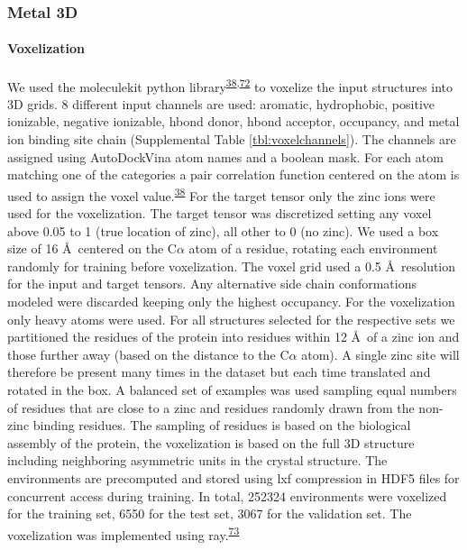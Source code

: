 \documentclass[  ASAPversion,
  ,
  9pt]{elife}
\begin{document}
\hypertarget{metal-3d}{%
\subsubsection{Metal 3D}\label{metal-3d}}

\hypertarget{voxelization}{%
\paragraph{Voxelization}\label{voxelization}}

We used the moleculekit python library\textsuperscript{\protect\hyperlink{ref-mVGaXlum}{38},\protect\hyperlink{ref-q2gxO5bP}{72}} to voxelize the input structures into 3D grids. 8 different input channels are used: aromatic, hydrophobic, positive ionizable, negative ionizable, hbond donor, hbond acceptor, occupancy, and metal ion binding site chain (Supplemental Table \ref{tbl:voxelchannels}). The channels are assigned using AutoDockVina atom names and a boolean mask. For each atom matching one of the categories a pair correlation function centered on the atom is used to assign the voxel value.\textsuperscript{\protect\hyperlink{ref-mVGaXlum}{38}} For the target tensor only the zinc ions were used for the voxelization. The target tensor was discretized setting any voxel above 0.05 to 1 (true location of zinc), all other to 0 (no zinc). We used a box size of 16 \AA\, centered on the C$\alpha$ atom of a residue, rotating each environment randomly for training before voxelization. The voxel grid used a 0.5 \AA\, resolution for the input and target tensors. Any alternative side chain conformations modeled were discarded keeping only the highest occupancy. For the voxelization only heavy atoms were used. For all structures selected for the respective sets we partitioned the residues of the protein into residues within 12 \AA\, of a zinc ion and those further away (based on the distance to the C$\alpha$ atom). A single zinc site will therefore be present many times in the dataset but each time translated and rotated in the box. A balanced set of examples was used sampling equal numbers of residues that are close to a zinc and residues randomly drawn from the non-zinc binding residues. The sampling of residues is based on the biological assembly of the protein, the voxelization is based on the full 3D structure including neighboring asymmetric units in the crystal structure. The environments are precomputed and stored using lxf compression in HDF5 files for concurrent access during training. In total, 252324 environments were voxelized for the training set, 6550 for the test set, 3067 for the validation set. The voxelization was implemented using ray.\textsuperscript{\protect\hyperlink{ref-19MS2ZVR1}{73}}
\end{document}
